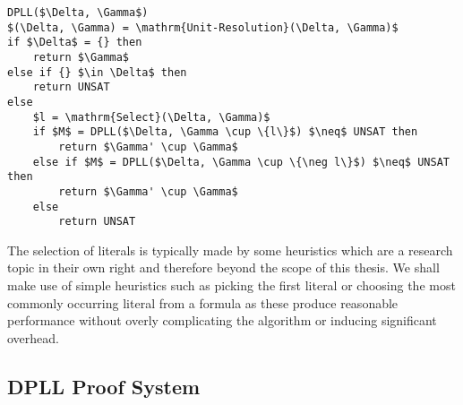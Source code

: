 \begin{lstlisting}[caption = Example DPLL Algorithm,mathescape]
DPLL($\Delta, \Gamma$)
$(\Delta, \Gamma) = \mathrm{Unit-Resolution}(\Delta, \Gamma)$
if $\Delta$ = {} then
	return $\Gamma$
else if {} $\in \Delta$ then
	return UNSAT
else
	$l = \mathrm{Select}(\Delta, \Gamma)$
	if $M$ = DPLL($\Delta, \Gamma \cup \{l\}$) $\neq$ UNSAT then
		return $\Gamma' \cup \Gamma$ 
	else if $M$ = DPLL($\Delta, \Gamma \cup \{\neg l\}$) $\neq$ UNSAT then 
		return $\Gamma' \cup \Gamma$ 
	else
		return UNSAT
\end{lstlisting}

The selection of literals is typically made by some heuristics which are a research topic in their own right and therefore beyond the scope of this thesis. We shall make use of simple heuristics such as  picking the first literal  or choosing the most commonly occurring literal  from a formula as these produce reasonable performance without overly complicating the algorithm or inducing significant overhead.

\subsection*{DPLL Proof System}

